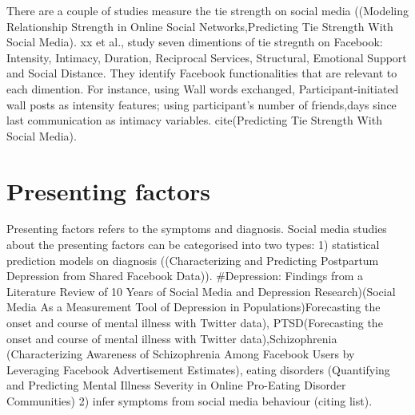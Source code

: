 There are a couple of studies measure the tie strength on social media ((Modeling Relationship Strength in Online Social Networks,Predicting Tie Strength With Social Media). xx et al., study seven dimentions of tie stregnth on Facebook: Intensity, Intimacy, Duration, Reciprocal Services,
Structural, Emotional Support and Social Distance. They identify Facebook functionalities that are relevant to each dimention. For instance, using Wall words exchanged, Participant-initiated wall posts as intensity features; using participant’s number of friends,days since last communication as intimacy variables.  cite(Predicting Tie Strength With Social Media). 


\section{Presenting factors}

Presenting factors refers to the symptoms and diagnosis. Social media studies about the presenting factors can be categorised into two types: 1) statistical prediction models on diagnosis ((Characterizing and Predicting Postpartum Depression from Shared Facebook Data)). 
#Depression: Findings from a Literature Review of 10 Years of Social Media and Depression Research)(Social Media As a Measurement Tool of Depression in Populations)Forecasting the onset and course of mental illness with Twitter data), PTSD(Forecasting the onset and course of mental illness with Twitter data),Schizophrenia (Characterizing Awareness of Schizophrenia Among Facebook Users by Leveraging Facebook Advertisement Estimates), eating disorders (Quantifying and Predicting Mental Illness Severity in Online Pro-Eating Disorder Communities) 2) infer symptoms from social media behaviour (citing list). 

